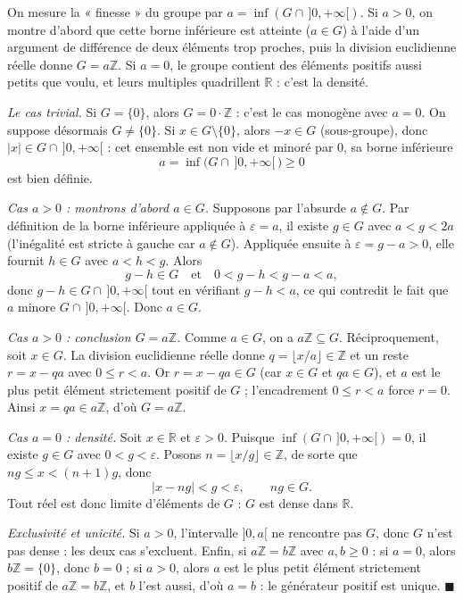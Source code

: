 \begin{ideepreuve}
On mesure la « finesse » du groupe par $a = \inf(G \cap \,]0,+\infty[)$.
Si $a > 0$, on montre d'abord que cette borne inférieure est atteinte
($a \in G$) à l'aide d'un argument de différence de deux éléments trop proches,
puis la division euclidienne réelle donne $G = a\mathbb{Z}$. Si $a = 0$, le
groupe contient des éléments positifs aussi petits que voulu, et leurs multiples
quadrillent $\mathbb{R}$ : c'est la densité.
\end{ideepreuve}


\begin{mdframed}[style=proofbar]
  \textit{Le cas trivial.}\enspace
  Si $G = \{0\}$, alors $G = 0\cdot\mathbb{Z}$ : c'est le cas monogène avec $a=0$.
  On suppose désormais $G \neq \{0\}$. Si $x \in G \setminus \{0\}$, alors $-x \in G$
  (sous-groupe), donc $|x| \in G \cap \,]0,+\infty[$ : cet ensemble est non vide
  et minoré par $0$, sa borne inférieure
  \[
    a = \inf\bigl(G \cap \,]0,+\infty[\,\bigr) \geq 0
  \]
  est bien définie.

  \medskip
  \textit{Cas $a > 0$ : montrons d'abord $a \in G$.}\enspace
  Supposons par l'absurde $a \notin G$. Par définition de la borne inférieure
  appliquée à $\varepsilon = a$, il existe $g \in G$ avec $a < g < 2a$ (l'inégalité
  est stricte à gauche car $a \notin G$). Appliquée ensuite à $\varepsilon = g - a > 0$,
  elle fournit $h \in G$ avec $a < h < g$. Alors
  \[
    g - h \in G \quad\text{et}\quad 0 < g - h < g - a < a,
  \]
  donc $g - h \in G \cap \,]0,+\infty[$ tout en vérifiant $g - h < a$, ce qui
  contredit le fait que $a$ minore $G \cap \,]0,+\infty[$. Donc $a \in G$.

  \medskip
  \textit{Cas $a > 0$ : conclusion $G = a\mathbb{Z}$.}\enspace
  Comme $a \in G$, on a $a\mathbb{Z} \subseteq G$. Réciproquement, soit $x \in G$.
  La division euclidienne réelle donne $q = \lfloor x/a \rfloor \in \mathbb{Z}$ et
  un reste $r = x - qa$ avec $0 \leq r < a$. Or $r = x - qa \in G$ (car $x \in G$
  et $qa \in G$), et $a$ est le plus petit élément strictement positif de $G$ ;
  l'encadrement $0 \leq r < a$ force $r = 0$. Ainsi $x = qa \in a\mathbb{Z}$, d'où
  $G = a\mathbb{Z}$.

  \medskip
  \textit{Cas $a = 0$ : densité.}\enspace
  Soit $x \in \mathbb{R}$ et $\varepsilon > 0$. Puisque $\inf(G \cap \,]0,+\infty[) = 0$,
  il existe $g \in G$ avec $0 < g < \varepsilon$. Posons $n = \lfloor x/g \rfloor \in \mathbb{Z}$,
  de sorte que $ng \leq x < (n+1)g$, donc
  \[
    |x - ng| < g < \varepsilon, \qquad ng \in G.
  \]
  Tout réel est donc limite d'éléments de $G$ : $G$ est dense dans $\mathbb{R}$.

  \medskip
  \textit{Exclusivité et unicité.}\enspace
  Si $a > 0$, l'intervalle $]0,a[$ ne rencontre pas $G$, donc $G$ n'est pas dense :
  les deux cas s'excluent. Enfin, si $a\mathbb{Z} = b\mathbb{Z}$ avec $a,b \geq 0$ :
  si $a = 0$, alors $b\mathbb{Z} = \{0\}$, donc $b = 0$ ; si $a > 0$, alors $a$ est
  le plus petit élément strictement positif de $a\mathbb{Z} = b\mathbb{Z}$, et $b$
  l'est aussi, d'où $a = b$ :
  le générateur positif est unique. \hfill$\blacksquare$
\end{mdframed}

